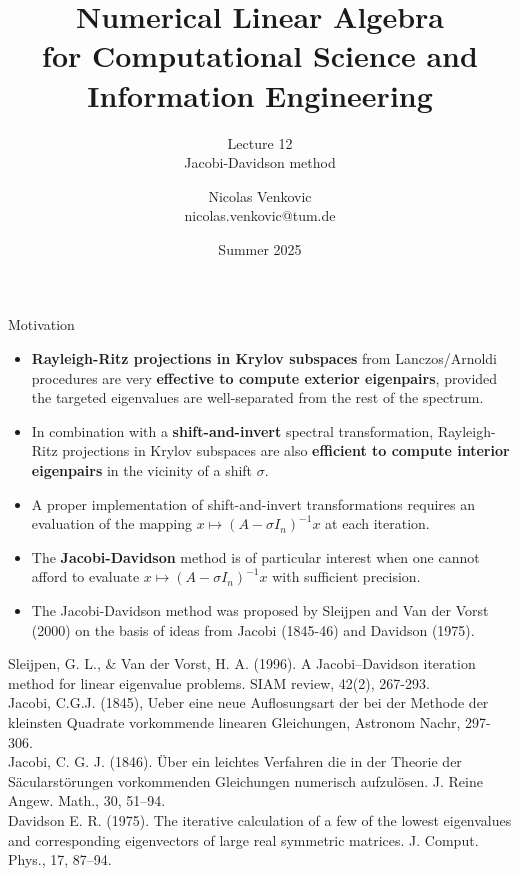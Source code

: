 \documentclass[t,usepdftitle=false]{beamer}
\title[NLA for CS and IE -- Lecture 12]{Numerical Linear Algebra\\for Computational Science and Information Engineering}
\subtitle{\vspace{.3cm}Lecture 12\\
Jacobi-Davidson method\vspace{-.47cm}}
\date[Summer 2025]{Summer 2025}
\author[nicolas.venkovic@tum.de]{Nicolas Venkovic\\{\small nicolas.venkovic@tum.de}}
\institute[]{Group of Computational Mathematics\\School of Computation, Information and Technology\\Technical University of Munich}
\begin{document}
	
\begin{frame}
	\maketitle
\end{frame}
	
\myoutlineframe

\begin{frame}{Motivation}
\begin{itemize}
\item \textbf{Rayleigh-Ritz projections in Krylov subspaces} from Lanczos/Arnoldi procedures are very \textbf{effective to compute exterior eigenpairs}, provided the targeted eigenvalues are well-separated from the rest of the spectrum.
\item In combination with a \textbf{shift-and-invert} spectral transformation, Rayleigh-Ritz projections in Krylov subspaces are also \textbf{efficient to
compute interior eigenpairs} in the vicinity of a shift $\sigma$.
\item[] A proper implementation of shift-and-invert transformations requires an evaluation of the mapping $x\mapsto(A-\sigma I_n)^{-1}x$ at each iteration.
\item The \textbf{Jacobi-Davidson} method is of particular interest when one cannot afford to evaluate $x\mapsto(A-\sigma I_n)^{-1}x$ with sufficient precision.
\item[] The Jacobi-Davidson method was proposed by Sleijpen and Van der Vorst (2000) on the basis of ideas from Jacobi (1845-46) and Davidson (1975).
\end{itemize}\smallskip
\tiny{Sleijpen, G. L., \& Van der Vorst, H. A. (1996). A Jacobi--Davidson iteration method for linear eigenvalue problems. SIAM review, 42(2), 267-293.}\tinyskip\\
\tiny{Jacobi, C.G.J. (1845), Ueber eine neue Auflosungsart der bei der Methode der kleinsten Quadrate vorkommende linearen Gleichungen, Astronom Nachr, 297-306.}\tinyskip\\
\tiny{Jacobi, C. G. J. (1846). \"{U}ber ein leichtes Verfahren die in der Theorie der S\"{a}cularstörungen vorkommenden Gleichungen numerisch aufzul\"{o}sen. J. Reine Angew. Math., 30, 51–94.}\tinyskip\\
\tiny{Davidson E. R. (1975). The iterative calculation of a few of the lowest eigenvalues and corresponding eigenvectors of large real symmetric matrices. J. Comput. Phys., 17, 87–94.}
\end{frame}
	
\end{document}
